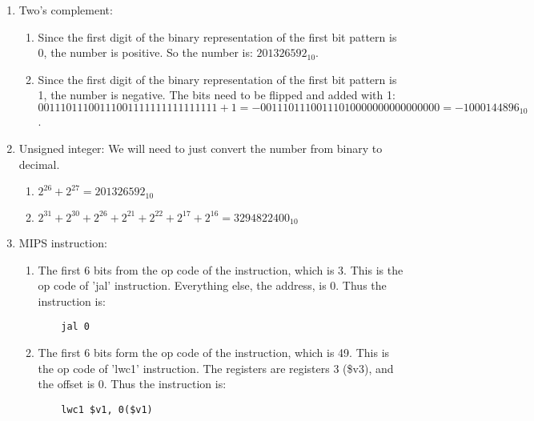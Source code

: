 \documentclass[a4paper]{article}
\begin{document}
\begin{enumerate}[label=(\alph*)]
\item Two's complement:
	\begin{enumerate}
	\item Since the first digit of the binary representation of the first bit pattern is 0, the number is positive. So the number is: $201326592_10$.
	\item Since the first digit of the binary representation of the first bit pattern is 1, the number is negative. The bits need to be flipped and added with 1: $0011 1011 1001 1100 1111 1111 1111 1111 + 1 = - 0011 1011 1001 1101 0000 0000 0000 0000 = - 1000144896_{10}$. 
	\end{enumerate}


\item Unsigned integer: We will need to just convert the number from binary to decimal.
	\begin{enumerate}
	\item $2^{26} + 2^{27} = 201326592_{10}$
	\item $2^31 + 2^30 + 2^26 + 2^21 + 2^22 + 2^17 + 2^16 = 3294822400_{10}$
	\end{enumerate}

\item MIPS instruction:
	\begin{enumerate}
	\item The first 6 bits from the op code of the instruction, which is 3. This is the op code of 'jal' instruction. Everything else, the address, is 0. Thus the instruction is:\\
	\begin{verbatim}
	jal 0
	\end{verbatim}
	
	\item The first 6 bits form the op code of the instruction, which is 49. This is the op code of 'lwc1' instruction. The registers are registers 3 (\$v3), and the offset is 0. Thus the instruction is:
	\begin{verbatim}
	lwc1 $v1, 0($v1)
	\end{verbatim}
	\end{enumerate}
\end{enumerate}

	
\end{document}
